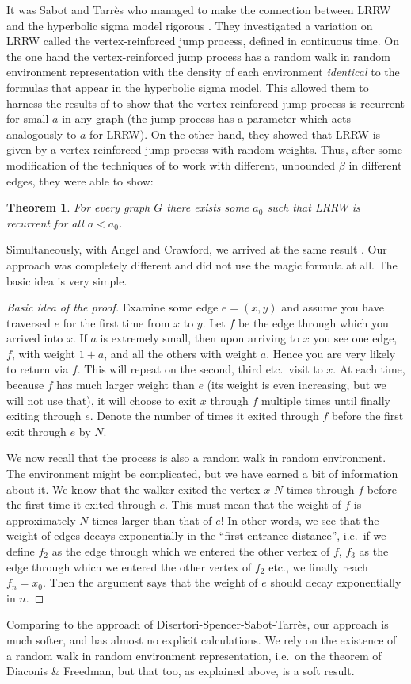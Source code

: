 \documentclass{emsprocart}
\theoremstyle{plain}
\newtheorem{thm}{Theorem}
\begin{document}
It was Sabot and Tarr\`es who managed to make the connection between
LRRW and the hyperbolic sigma model rigorous \cite{ST}. They investigated
a variation on LRRW called the vertex-reinforced jump process, defined
in continuous time. On the one hand the vertex-reinforced jump process
has a random walk in random environment representation with the density
of each environment \emph{identical} to the formulas that appear in
the hyperbolic sigma model. This allowed them to harness the results
of \cite{DS10} to show that the vertex-reinforced jump process is
recurrent for small $a$ in any graph (the jump process has a parameter
which acts analogously to $a$ for LRRW). On the other hand, they showed
that LRRW is given by a vertex-reinforced jump process with random
weights. Thus, after some modification of the techniques of \cite{DS10}
to work with different, unbounded $\beta$ in different edges, they
were able to show:
\begin{thm}
For every graph $G$ there exists some $a_{0}$ such that LRRW is
recurrent for all $a<a_{0}$.
\end{thm}
Simultaneously, with Angel and Crawford, we arrived at the same result
\cite{ACK}. Our approach was completely different and did not use
the magic formula at all. The basic idea is very simple.
\begin{proof}
[Basic idea of the proof]Examine some edge $e=(x,y)$ and assume
you have traversed $e$ for the first time from $x$ to $y$. Let
$f$ be the edge through which you arrived into $x$. If $a$ is extremely
small, then upon arriving to $x$ you see one edge, $f$, with weight
$1+a$, and all the others with weight $a$. Hence you are very likely
to return via $f$. This will repeat on the second, third etc.\ visit
to $x$. At each time, because $f$ has much larger weight than $e$
(its weight is even increasing, but we will not use that), it will
choose to exit $x$ through $f$ multiple times until finally exiting
through $e$. Denote the number of times it exited through $f$ before
the first exit through $e$ by $N$.

We now recall that the process is also a random walk in random environment.
The environment might be complicated, but we have earned a bit of
information about it. We know that the walker exited the vertex $x$
$N$ times through $f$ before the first time it exited through $e$.
This must mean that the weight of $f$ is approximately $N$ times
larger than that of $e$! In other words, we see that the weight of
edges decays exponentially in the ``first entrance distance'', i.e.\ if
we define $f_{2}$ as the edge through which we entered the other
vertex of $f$, $f_{3}$ as the edge through which we entered the
other vertex of $f_{2}$ etc., we finally reach $f_{n}=x_{0}$. Then
the argument says that the weight of $e$ should decay exponentially
in $n$.
\end{proof}
Comparing to the approach of Disertori-Spencer-Sabot-Tarr\`es, our approach
is much softer, and has almost no explicit calculations. We rely on
the existence of a random walk in random environment representation,
i.e.\ on the theorem of Diaconis \& Freedman, but that too, as explained
above, is a soft result.
\end{document}
